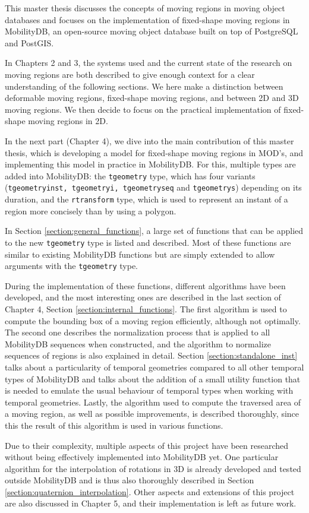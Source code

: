 \label{section:summary}

This master thesis discusses the concepts of moving regions in moving object databases and focuses on the implementation of fixed-shape moving regions in MobilityDB, an open-source moving object database built on top of PostgreSQL and PostGIS.

In Chapters 2 and 3, the systems used and the current state of the research on moving regions are both described to give enough context for a clear understanding of the following sections. We here make a distinction between deformable moving regions, fixed-shape moving regions, and between 2D and 3D moving regions. We then decide to focus on the practical implementation of fixed-shape moving regions in 2D.

In the next part (Chapter 4), we dive into the main contribution of this master thesis, which is developing a model for fixed-shape moving regions in MOD's, and implementing this model in practice in MobilityDB. For this, multiple types are added into MobilityDB: the \lstinline{tgeometry} type, which has four variants (\lstinline{tgeometryinst, tgeometryi, tgeometryseq} and \lstinline{tgeometrys}) depending on its duration, and the \lstinline{rtransform} type, which is used to represent an instant of a region more concisely than by using a polygon.

In Section \ref{section:general_functions}, a large set of functions that can be applied to the new \lstinline{tgeometry} type is listed and described. Most of these functions are similar to existing MobilityDB functions but are simply extended to allow arguments with the \lstinline{tgeometry} type.

During the implementation of these functions, different algorithms have been developed, and the most interesting ones are described in the last section of Chapter 4, Section \ref{section:internal_functions}. The first algorithm is used to compute the bounding box of a moving region efficiently, although not optimally. The second one describes the normalization process that is applied to all MobilityDB sequences when constructed, and the algorithm to normalize sequences of regions is also explained in detail. Section \ref{section:standalone_inst} talks about a particularity of temporal geometries compared to all other temporal types of MobilityDB and talks about the addition of a small utility function that is needed to emulate the usual behaviour of temporal types when working with temporal geometries. Lastly, the algorithm used to compute the traversed area of a moving region, as well as possible improvements,  is described thoroughly, since this the result of this algorithm is used in various functions.

Due to their complexity, multiple aspects of this project have been researched without being effectively implemented into MobilityDB yet. One particular algorithm for the interpolation of rotations in 3D is already developed and tested outside MobilityDB and is thus also thoroughly described in Section \ref{section:quaternion_interpolation}. Other aspects and extensions of this project are also discussed in Chapter 5, and their implementation is left as future work.